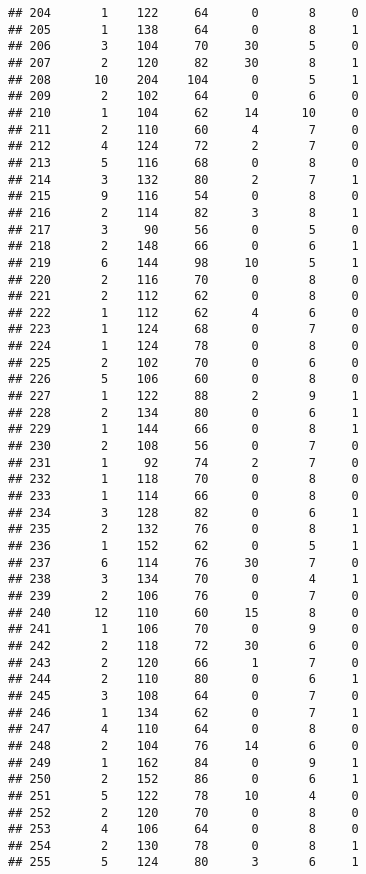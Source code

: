 \documentclass[
]{article}
\begin{document}
\begin{verbatim}
## 204       1    122     64      0       8     0
## 205       1    138     64      0       8     1
## 206       3    104     70     30       5     0
## 207       2    120     82     30       8     1
## 208      10    204    104      0       5     1
## 209       2    102     64      0       6     0
## 210       1    104     62     14      10     0
## 211       2    110     60      4       7     0
## 212       4    124     72      2       7     0
## 213       5    116     68      0       8     0
## 214       3    132     80      2       7     1
## 215       9    116     54      0       8     0
## 216       2    114     82      3       8     1
## 217       3     90     56      0       5     0
## 218       2    148     66      0       6     1
## 219       6    144     98     10       5     1
## 220       2    116     70      0       8     0
## 221       2    112     62      0       8     0
## 222       1    112     62      4       6     0
## 223       1    124     68      0       7     0
## 224       1    124     78      0       8     0
## 225       2    102     70      0       6     0
## 226       5    106     60      0       8     0
## 227       1    122     88      2       9     1
## 228       2    134     80      0       6     1
## 229       1    144     66      0       8     1
## 230       2    108     56      0       7     0
## 231       1     92     74      2       7     0
## 232       1    118     70      0       8     0
## 233       1    114     66      0       8     0
## 234       3    128     82      0       6     1
## 235       2    132     76      0       8     1
## 236       1    152     62      0       5     1
## 237       6    114     76     30       7     0
## 238       3    134     70      0       4     1
## 239       2    106     76      0       7     0
## 240      12    110     60     15       8     0
## 241       1    106     70      0       9     0
## 242       2    118     72     30       6     0
## 243       2    120     66      1       7     0
## 244       2    110     80      0       6     1
## 245       3    108     64      0       7     0
## 246       1    134     62      0       7     1
## 247       4    110     64      0       8     0
## 248       2    104     76     14       6     0
## 249       1    162     84      0       9     1
## 250       2    152     86      0       6     1
## 251       5    122     78     10       4     0
## 252       2    120     70      0       8     0
## 253       4    106     64      0       8     0
## 254       2    130     78      0       8     1
## 255       5    124     80      3       6     1

\end{verbatim}
\end{document}
